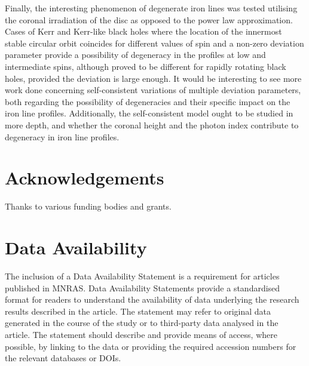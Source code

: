 \documentclass[fleqn,usenatbib,useAMS]{mnras}
\begin{document}
Finally, the interesting phenomenon of degenerate iron lines was tested utilising the coronal irradiation of the disc as opposed to the power law approximation. Cases of Kerr and Kerr-like black holes where the location of the innermost stable circular orbit coincides for different values of spin and a non-zero deviation parameter provide a possibility of degeneracy in the profiles at low and intermediate spins, although proved to be different for rapidly rotating black holes, provided the deviation is large enough. It would be interesting to see more work done concerning self-consistent variations of multiple deviation parameters, both regarding the possibility of degeneracies and their specific impact on the iron line profiles. Additionally, the self-consistent model ought to be studied in more depth, and whether the coronal height and the photon index contribute to degeneracy in iron line profiles.

\section*{Acknowledgements}

Thanks to various funding bodies and grants.

\section*{Data Availability}
 
The inclusion of a Data Availability Statement is a requirement for articles published in MNRAS. Data Availability Statements provide a standardised format for readers to understand the availability of data underlying the research results described in the article. The statement may refer to original data generated in the course of the study or to third-party data analysed in the article. The statement should describe and provide means of access, where possible, by linking to the data or providing the required accession numbers for the relevant databases or DOIs.




\bsp
\label{lastpage}
\end{document}
